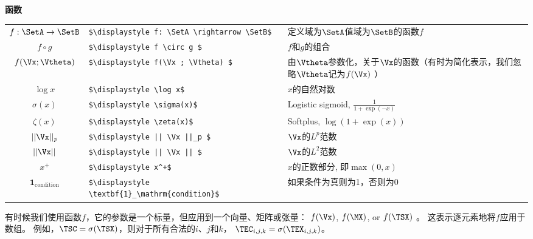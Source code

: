 \vspace{\notationgap}
\begin{minipage}{\textwidth}
\centerline{\bf 函数}
\bgroup
\def\arraystretch{1.5}
\begin{tabular}{clp{3.25in}}
$\displaystyle f: \SetA \rightarrow \SetB$ 			&\lstinline!$\displaystyle f: \SetA \rightarrow \SetB$ 			!						& 定义域为$\SetA$值域为$\SetB$的函数$f$ \\
$\displaystyle f \circ g $ 							&\lstinline!$\displaystyle f \circ g $ 							!		&  $f$和$g$的组合 \\
$\displaystyle f(\Vx ; \Vtheta) $ 					&\lstinline!$\displaystyle f(\Vx ; \Vtheta) $ 					!				&  由$\Vtheta$参数化，关于$\Vx$的函数（有时为简化表示，我们忽略$\Vtheta$记为$f(\Vx)$ ）\\
$\displaystyle \log x$ 								&\lstinline!$\displaystyle \log x$ 								!	& $x$的自然对数 \\
$\displaystyle \sigma(x)$ 							&\lstinline!$\displaystyle \sigma(x)$ 							!		& Logistic sigmoid, $\displaystyle \frac{1} {1 + \exp(-x)}$ \\
$\displaystyle \zeta(x)$ 							&\lstinline!$\displaystyle \zeta(x)$ 							!		& Softplus, $\log(1 + \exp(x))$ \\
$\displaystyle || \Vx ||_p $ 						&\lstinline!$\displaystyle || \Vx ||_p $ 						!			& $\Vx$的$L^p$范数 \\
$\displaystyle || \Vx || $ 							&\lstinline!$\displaystyle || \Vx || $ 							!		&  $\Vx$的$L^2$范数 \\
$\displaystyle x^+$ 								&\lstinline!$\displaystyle x^+$ 								!	& $x$的正数部分, 即$\max(0,x)$\\
$\displaystyle \textbf{1}_\mathrm{condition}$ 		&\lstinline!$\displaystyle \textbf{1}_\mathrm{condition}$ 		!							& 如果条件为真则为1，否则为0\\ 
\end{tabular}
\egroup
\end{minipage}

有时候我们使用函数$f$，它的参数是一个标量，但应用到一个向量、矩阵或张量： $f(\Vx)$, $f(\MX)$, or $f(\TSX)$ 。
这表示逐元素地将$f$应用于数组。
例如，$\TSC = \sigma(\TSX)$，则对于所有合法的$i$、$j$和$k$， $\TEC_{i,j,k} = \sigma(\TEX_{i,j,k})$。


